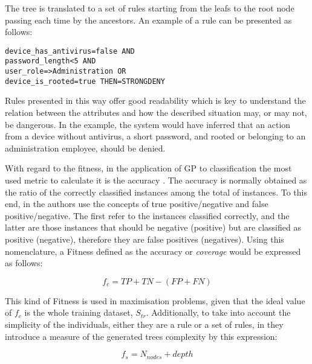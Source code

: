 \documentclass[a4paper,10pt,twocolumn,preprint,3p]{elsarticle}
\begin{document}
The tree is translated to a set of rules starting from the leafs to the root node passing each time by the ancestors. An example of a rule can be presented as follows:

\begin{verbatim}
device_has_antivirus=false AND
password_length<5 AND
user_role=>Administration OR
device_is_rooted=true THEN=STRONGDENY
\end{verbatim}

Rules presented in this way offer good readability which is key to understand the relation between the attributes and how the described situation may, or may not, be dangerous. In the example, the system would have inferred that an action from a device without antivirus, a short password, and rooted or belonging to an administration employee, should be denied.

With regard to the fitness, in the application of GP to classification the most used metric to calculate it is the accuracy \cite{espejo2010survey}. The accuracy is normally obtained as the ratio of the correctly classified instances among the total of instances. To this end, in \cite{witten2005data} the authors use the concepts of true positive/negative and false positive/negative. The first refer to the instances classified correctly, and the latter are those instances that should be negative (positive) but are classified as positive (negative), therefore they are false positives (negatives). Using this nomenclature, a Fitness defined as the accuracy or \textit{coverage} would be expressed as follows:


\begin{equation}
\label{eq:coverage}
f_{c} = TP + TN - (FP + FN)
\end{equation}

This kind of Fitness is used in maximisation problems, given that the ideal value of $f_{c}$ is the whole training dataset, $S_{tr}$. Additionally, to take into account the simplicity of the individuals, either they are a rule or a set of rules, in \cite{witten2005data} they introduce a measure of the generated trees complexity by this expression:

\begin{equation}
f_{s} = N_{nodes} + depth
\end{equation}
\end{document}
